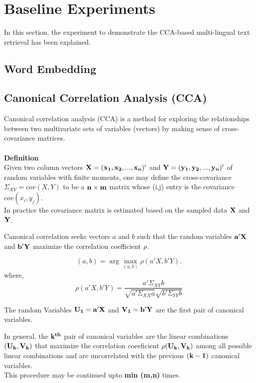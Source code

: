 \documentclass{article} %
\begin{document}
\section{Baseline Experiments}
\label{experiment}

In this section, the experiment to demonstrate the CCA-based multi-lingual text retrieval has been explained.
\subsection{Word Embedding}
\subsection{Canonical Correlation Analysis (CCA)}

Canonical correlation analysis (CCA) is a method for exploring the relationships between two multivariate sets of variables (vectors) by making sense of cross-covariance matrices.
\\\\
{\bf Definition}\\
Given two column vectors $\bf{{X} = (x_1, x_2,..., x_n)'}$ and  $\bf{{Y} = (y_1, y_2,..., y_n)'}$ of random variables with finite moments, one may define the cross-covariance ${\Sigma_{XY}} = cov({X},{Y})$ to be a ${{\bf n}\times{\bf m}}$ matrix whose (i,j) entry is the covariance $cov(x_i,y_j)$.\\
In practice the covariance matrix is estimated based on the sampled data $\bf{X}$ and $\bf{Y}$.


Canonical correlation seeks vectors ${a}$ and ${b}$ such that the random variables $\bf{a'X}$ and $\bf{b'Y}$ maximize the correlation coefficient ${\bf \rho}$.

\begin{equation}
		(a,b) = \arg \max_{(a,b)} {\rho}({a'X},{b'Y}).
\end{equation}
where,
\begin{equation}	
	\rho({a'X},{b'Y}) = \frac{a' \Sigma_{XY} b}{\sqrt{a'\Sigma_{XX}a}\sqrt{b'\Sigma_{YY}b}}	
\end{equation}

The random Variables $\bf{U_1 = a'X}$ and $\bf{V_1 = b'Y}$ are the first pair of canonical variables.

In general, the $\bf{k^{th}}$ pair of canonical variables are the linear combinations $(\bf{U_k,V_k})$ that maximize the correlation coeeficient $\bf{\rho}(\bf{U_k,V_k})$ among all possible linear combinations and are uncorrelated with the previous $\bf{(k-1)}$ canonical variables.\\
This procedure may be continued upto {\bf{min (m,n)}} times.
\end{document}
